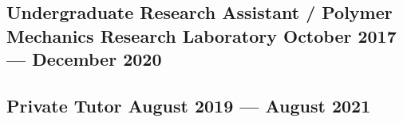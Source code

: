 \documentclass{article}
\begin{document}
\subsection{{Undergraduate Research Assistant / Polymer Mechanics Research Laboratory \hfill October 2017 --- December 2020}}

\subsection{{Private Tutor \hfill August 2019 --- August 2021}}
\end{document}
